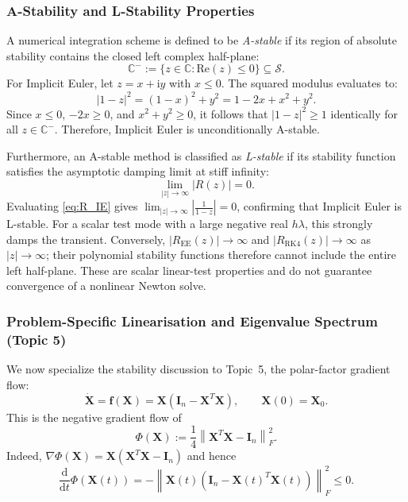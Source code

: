 \documentclass[11pt,a4paper]{article}
\theoremstyle{definition}
\theoremstyle{remark}
\begin{document}
\subsubsection{A-Stability and L-Stability Properties}
A numerical integration scheme is defined to be \emph{A-stable} if its region of absolute stability contains the closed left complex half-plane:
\begin{equation}
\label{eq:a_stability_def}
\mathbb{C}^- := \{ z \in \mathbb{C} : \mathrm{Re}(z) \le 0 \} \subseteq \mathcal{S}.
\end{equation}
For Implicit Euler, let $z = x + \mathrm{i}y$ with $x \le 0$. The squared modulus evaluates to:
\begin{equation}
\label{eq:a_stability_proof}
|1 - z|^2 = (1 - x)^2 + y^2 = 1 - 2x + x^2 + y^2.
\end{equation}
Since $x \le 0$, $-2x \ge 0$, and $x^2 + y^2 \ge 0$, it follows that $|1 - z|^2 \ge 1$ identically for all $z \in \mathbb{C}^-$. Therefore, Implicit Euler is unconditionally A-stable.

Furthermore, an A-stable method is classified as \emph{L-stable} if its stability function satisfies the asymptotic damping limit at stiff infinity:
\begin{equation}
\label{eq:l_stability_def}
\lim_{|z| \to \infty} |R(z)| = 0.
\end{equation}
Evaluating \eqref{eq:R_IE} gives $\lim_{|z| \to \infty} \left|\frac{1}{1 - z}\right| = 0$, confirming that Implicit Euler is L-stable. For a scalar test mode with a large negative real $h\lambda$, this strongly damps the transient. Conversely, $|R_{\mathrm{EE}}(z)|\to\infty$ and $|R_{\mathrm{RK4}}(z)|\to\infty$ as $|z|\to\infty$; their polynomial stability functions therefore cannot include the entire left half-plane. These are scalar linear-test properties and do not guarantee convergence of a nonlinear Newton solve.

\subsubsection{Problem-Specific Linearisation and Eigenvalue Spectrum (Topic 5)}
We now specialize the stability discussion to Topic~5, the polar-factor gradient flow:
\begin{equation}
\label{eq:polar_flow_spec}
\dot{\mathbf{X}} = \mathbf{f}(\mathbf{X}) = \mathbf{X}\left(\mathbf{I}_n - \mathbf{X}^T \mathbf{X}\right), \qquad \mathbf{X}(0) = \mathbf{X}_0.
\end{equation}
This is the negative gradient flow of
\begin{equation}
\label{eq:polar_lyapunov}
\Phi(\mathbf{X}) := \frac14\left\|\mathbf{X}^T\mathbf{X}-\mathbf{I}_n\right\|_F^2.
\end{equation}
Indeed, $\nabla\Phi(\mathbf{X})=\mathbf{X}(\mathbf{X}^T\mathbf{X}-\mathbf{I}_n)$ and hence
\begin{equation}
\label{eq:polar_lyapunov_decay}
\frac{\mathrm{d}}{\mathrm{d}t}\Phi(\mathbf{X}(t))
=-\left\|\mathbf{X}(t)\left(\mathbf{I}_n-\mathbf{X}(t)^T\mathbf{X}(t)\right)\right\|_F^2\le 0.
\end{equation}
\end{document}
